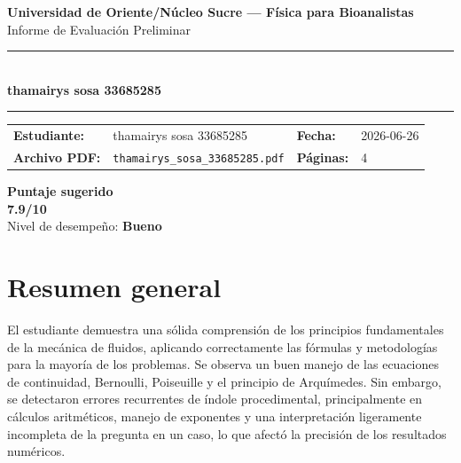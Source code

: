 \documentclass[11pt,a4paper]{article}
\begin{document}
\begin{center}
  {\Large\bfseries\color{azulTitulo} Universidad de Oriente/Núcleo Sucre --- Física para Bioanalistas}\\[4pt]
  {\large Informe de Evaluación Preliminar}\\[12pt]
  \rule{\linewidth}{1.2pt}\\[6pt]
  {\LARGE\bfseries thamairys sosa 33685285}\\[4pt]
  \rule{\linewidth}{0.6pt}
\end{center}

\vspace{4pt}
\begin{tcolorbox}[cajaTitulo, title=Datos del informe]
\begin{tabular}{@{}llll@{}}
  \textbf{Estudiante:}  & thamairys sosa 33685285  &
  \textbf{Fecha:}       & 2026-06-26 \\[4pt]
  \textbf{Archivo PDF:} & \texttt{thamairys\_sosa\_33685285.pdf}  &
  \textbf{Páginas:}     & 4 \\
\end{tabular}
\end{tcolorbox}

\vspace{6pt}
\begin{center}
  \begin{tcolorbox}[
    enhanced,
    colback=white, colframe=desempeno_bueno,
    width=0.62\linewidth,
    boxrule=2pt,
    halign=center, valign=center,
    top=8pt, bottom=8pt,
  ]
    \centering
    {\large\bfseries Puntaje sugerido}\\[6pt]
    {\Huge\bfseries\color{desempeno_bueno} 7.9/10}\\[6pt]
    {\large Nivel de desempeño: \textbf{\color{desempeno_bueno} Bueno}}
  \end{tcolorbox}
\end{center}

\section*{Resumen general}
El estudiante demuestra una sólida comprensión de los principios fundamentales de la mecánica de fluidos, aplicando correctamente las fórmulas y metodologías para la mayoría de los problemas. Se observa un buen manejo de las ecuaciones de continuidad, Bernoulli, Poiseuille y el principio de Arquímedes. Sin embargo, se detectaron errores recurrentes de índole procedimental, principalmente en cálculos aritméticos, manejo de exponentes y una interpretación ligeramente incompleta de la pregunta en un caso, lo que afectó la precisión de los resultados numéricos.
\end{document}
